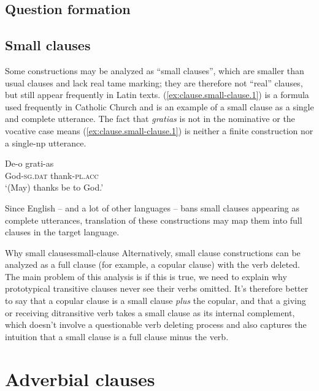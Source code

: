 \documentclass[a4paper, oneside]{report}
\newcommand{\form}[1]{\emph{#1}}
\newcommand*{\category}[1]{\textsc{#1}}
\newcommand{\translate}[1]{`#1'}
\begin{document}
\section{Question formation}

\section{Small clauses}

Some constructions may be analyzed as ``small clauses'', 
which are smaller than usual clauses 
and lack real \acs{tame} marking;
they are therefore not ``real'' clauses, 
but still appear frequently in Latin texts.
(\ref{ex:clause.small-clause.1}) is a formula used frequently in Catholic Church 
and is an example of a small clause 
as a single and complete utterance.
The fact that \form{gratias} is not in the nominative or the vocative case 
means (\ref{ex:clause.small-clause.1}) is 
neither a finite construction nor a single-\acs{np} utterance.


\begin{exe}
    \ex \gll De-o grati-as \\
    God-\category{sg}.\category{dat} thank-\category{pl}.\category{acc} \\
    \glt \translate{(May) thanks be to God.}
    \label{ex:clause.small-clause.1}
\end{exe}

Since English -- and a lot of other languages -- 
bans small clauses appearing as complete utterances,
translation of these constructions may map them into full clauses in the target language. 

\begin{infobox}{Why small clauses}{small-clause}
    Alternatively, small clause constructions can be analyzed 
    as a full clause (for example, a copular clause) with the verb deleted.
    The main problem of this analysis is if this is true, 
    we need to explain why prototypical transitive clauses 
    never see their verbs omitted.
    It's therefore better to say 
    that a copular clause is a small clause \emph{plus} the copular,
    and that a giving or receiving ditransitive verb 
    takes a small clause as its internal complement,
    which doesn't involve a questionable verb deleting process
    and also captures the intuition that 
    a small clause is a full clause minus the verb.
\end{infobox}



\chapter{Adverbial clauses}
\end{document}
